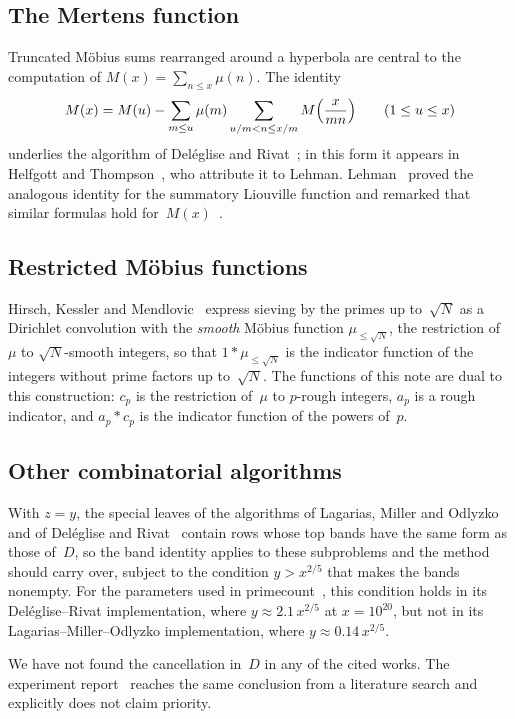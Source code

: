 \documentclass[11pt,a4paper]{amsart}
\numberwithin{equation}{section}
\begin{document}
\subsection{The Mertens function}
Truncated M\"obius sums rearranged around a hyperbola are central to the
computation of $M(x)=\sum_{n\le x}\mu(n)$. The identity
\[
  M(x)=M(u)-\sum_{m\le u}\mu(m)\sum_{u/m<n\le x/m}M\Bigl(\frac{x}{mn}\Bigr)
  \qquad(1\le u\le x)
\]
underlies the algorithm of Del\'eglise and Rivat~\cite{DR1996b}; in this form it
appears in Helfgott and Thompson~\cite[\S2]{HT2023}, who attribute it to Lehman.
Lehman~\cite[Theorem~1]{Lehman1960} proved the analogous identity for the
summatory Liouville function and remarked that similar formulas hold
for~$M(x)$~\cite[p.~315]{Lehman1960}.

\subsection{Restricted M\"obius functions}
Hirsch, Kessler and Mendlovic~\cite[\S2.1]{HKM2022} express sieving by the primes
up to~$\sqrt N$ as a Dirichlet convolution with the \emph{smooth} M\"obius
function $\mu_{\le\sqrt N}$, the restriction of~$\mu$ to $\sqrt N$-smooth
integers, so that $1*\mu_{\le\sqrt N}$ is the indicator function of the integers
without prime factors up to~$\sqrt N$. The functions of this note are dual to
this construction: $c_p$ is the restriction of~$\mu$ to $p$-rough integers,
$a_p$ is a rough indicator, and $a_p*c_p$ is the indicator function of the
powers of~$p$.

\subsection{Other combinatorial algorithms}
With $z=y$, the special leaves of the algorithms of Lagarias, Miller and
Odlyzko~\cite{LMO1985} and of Del\'eglise and Rivat~\cite{DR1996} contain rows
whose top bands have the same form as those of~$D$, so the band identity applies
to these subproblems and the method should carry over, subject to the condition
$y>x^{2/5}$ that makes the bands nonempty. For the parameters used in
primecount~\cite{primecount}, this condition holds in its Del\'eglise--Rivat
implementation, where $y\approx2.1\,x^{2/5}$ at $x=10^{20}$, but not in its
Lagarias--Miller--Odlyzko implementation, where $y\approx0.14\,x^{2/5}$.

We have not found the cancellation in~$D$ in any of the cited works. The
experiment report~\cite[\S11]{Lin2026} reaches the same conclusion from a
literature search and explicitly does not claim priority.
\end{document}
